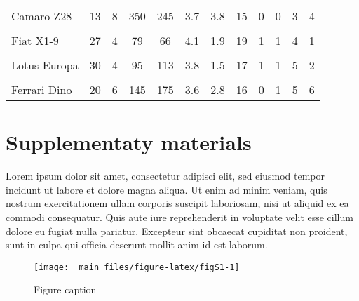 \documentclass[
  12pt,
]{article}
\begin{document}
\begin{longtable}[t]{lccccccccccc}
Camaro Z28 & 13 & 8 & 350 & 245 & 3.7 & 3.8 & 15 & 0 & 0 & 3 & 4\\
\cellcolor{gray!6}{Pontiac Firebird} & \cellcolor{gray!6}{19} & \cellcolor{gray!6}{8} & \cellcolor{gray!6}{400} & \cellcolor{gray!6}{175} & \cellcolor{gray!6}{3.1} & \cellcolor{gray!6}{3.8} & \cellcolor{gray!6}{17} & \cellcolor{gray!6}{0} & \cellcolor{gray!6}{0} & \cellcolor{gray!6}{3} & \cellcolor{gray!6}{2}\\
\addlinespace
Fiat X1-9 & 27 & 4 & 79 & 66 & 4.1 & 1.9 & 19 & 1 & 1 & 4 & 1\\
\cellcolor{gray!6}{Porsche 914-2} & \cellcolor{gray!6}{26} & \cellcolor{gray!6}{4} & \cellcolor{gray!6}{120} & \cellcolor{gray!6}{91} & \cellcolor{gray!6}{4.4} & \cellcolor{gray!6}{2.1} & \cellcolor{gray!6}{17} & \cellcolor{gray!6}{0} & \cellcolor{gray!6}{1} & \cellcolor{gray!6}{5} & \cellcolor{gray!6}{2}\\
Lotus Europa & 30 & 4 & 95 & 113 & 3.8 & 1.5 & 17 & 1 & 1 & 5 & 2\\
\cellcolor{gray!6}{Ford Pantera L} & \cellcolor{gray!6}{16} & \cellcolor{gray!6}{8} & \cellcolor{gray!6}{351} & \cellcolor{gray!6}{264} & \cellcolor{gray!6}{4.2} & \cellcolor{gray!6}{3.2} & \cellcolor{gray!6}{14} & \cellcolor{gray!6}{0} & \cellcolor{gray!6}{1} & \cellcolor{gray!6}{5} & \cellcolor{gray!6}{4}\\
Ferrari Dino & 20 & 6 & 145 & 175 & 3.6 & 2.8 & 16 & 0 & 1 & 5 & 6\\*
\end{longtable}
\endgroup{}

\pagebreak

\hypertarget{supplementaty-materials}{%
\section*{Supplementaty materials}\label{supplementaty-materials}}

\renewcommand{\thefigure}{S\arabic{figure}}
\setcounter{figure}{0}
\renewcommand{\thetable}{S\arabic{table}}
\setcounter{table}{0}
\renewcommand{\theequation}{S\arabic{equation}}
\setcounter{equation}{0}

Lorem ipsum dolor sit amet, consectetur adipisci elit, sed eiusmod tempor incidunt ut labore et dolore magna aliqua. Ut enim ad minim veniam, quis nostrum exercitationem ullam corporis suscipit laboriosam, nisi ut aliquid ex ea commodi consequatur. Quis aute iure reprehenderit in voluptate velit esse cillum dolore eu fugiat nulla pariatur. Excepteur sint obcaecat cupiditat non proident, sunt in culpa qui officia deserunt mollit anim id est laborum.

\begin{figure}[H]
\texttt{[image: \_main\_files/figure-latex/figS1-1]} \caption{Figure caption}\label{fig:figS1}
\end{figure}
\end{document}
